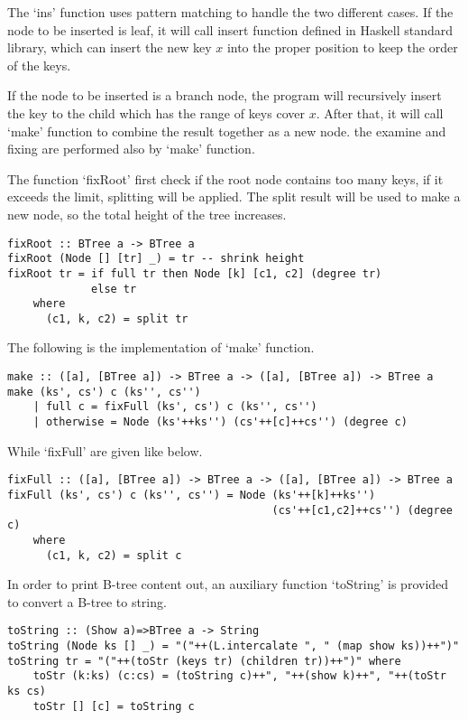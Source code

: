 \documentclass{article}
\begin{document}
The `ins' function uses pattern matching to handle the two different
cases. If the node to be inserted is leaf, it will call insert
function defined in Haskell standard library, which can insert the
new key $x$ into the proper position to keep the order of the keys.

If the node to be inserted is a branch node, the program will recursively
insert the key to the child which has the range of keys cover $x$.
After that, it will call `make' function to combine the result
together as a new node. the examine and fixing are performed also
by `make' function.

The function `fixRoot' first check if the root node contains too
many keys, if it exceeds the limit, splitting will be applied.
The split result will be used to make a new node, so the total
height of the tree increases.

\begin{lstlisting}
fixRoot :: BTree a -> BTree a
fixRoot (Node [] [tr] _) = tr -- shrink height
fixRoot tr = if full tr then Node [k] [c1, c2] (degree tr)
             else tr
    where
      (c1, k, c2) = split tr
\end{lstlisting}

The following is the implementation of `make' function.

\begin{lstlisting}
make :: ([a], [BTree a]) -> BTree a -> ([a], [BTree a]) -> BTree a
make (ks', cs') c (ks'', cs'')
    | full c = fixFull (ks', cs') c (ks'', cs'')
    | otherwise = Node (ks'++ks'') (cs'++[c]++cs'') (degree c)
\end{lstlisting}

While `fixFull' are given like below.

\begin{lstlisting}
fixFull :: ([a], [BTree a]) -> BTree a -> ([a], [BTree a]) -> BTree a
fixFull (ks', cs') c (ks'', cs'') = Node (ks'++[k]++ks'')
                                         (cs'++[c1,c2]++cs'') (degree c)
    where
      (c1, k, c2) = split c
\end{lstlisting}

In order to print B-tree content out, an auxiliary function `toString'
is provided to convert a B-tree to string.

\begin{lstlisting}
toString :: (Show a)=>BTree a -> String
toString (Node ks [] _) = "("++(L.intercalate ", " (map show ks))++")"
toString tr = "("++(toStr (keys tr) (children tr))++")" where
    toStr (k:ks) (c:cs) = (toString c)++", "++(show k)++", "++(toStr ks cs)
    toStr [] [c] = toString c
\end{lstlisting}
\end{document}
